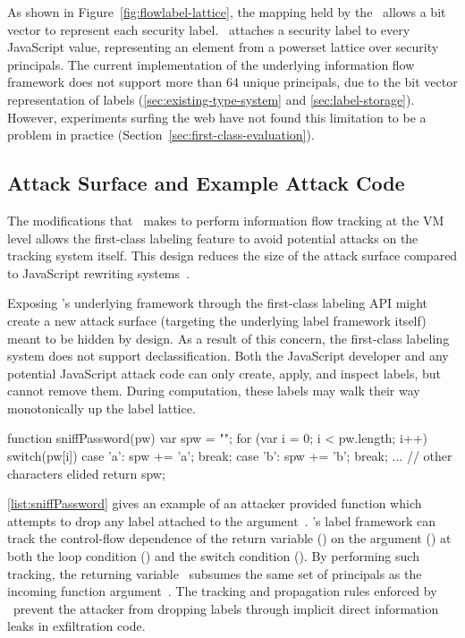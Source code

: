 As shown in Figure~\ref{fig:flowlabel-lattice}, the mapping held by the \FlowLabelRegistry\ allows a bit vector to represent each security label.
\FlowCore\ attaches a security label to every JavaScript value, representing an element from a powerset lattice over security principals.
The current implementation of the underlying information flow framework does not support more than 64 unique principals, due to the bit vector representation of labels (\autoref{sec:existing-type-system} and \autoref{sec:label-storage}).
However, experiments surfing the web have not found this limitation to be a problem in practice (Section~\ref{sec:first-class-evaluation}).

\subsection{Attack Surface and Example Attack Code}
\label{subsec:attack}

The modifications that \FlowCore\ makes to perform information flow tracking at the VM level allows the first-class labeling feature to avoid potential attacks on the tracking system itself.
This design reduces the size of the attack surface compared to JavaScript rewriting systems~\cite{chugh.etal+09, jang.etal+10}.

Exposing \FlowCore's underlying framework through the first-class labeling API might create a new attack surface (targeting the underlying label framework itself) meant to be hidden by design.
As a result of this concern, the first-class labeling system does not support declassification.
Both the JavaScript developer and any potential JavaScript attack code can only create, apply, and inspect labels, but cannot remove them.
During computation, these labels may walk their way monotonically up the label lattice.

\begin{jscode}
function sniffPassword(pw) {
  var spw = "";
  for (var i = 0; i < pw.length; i++) {
    switch(pw[i]) {
    case 'a': spw += 'a'; break;
    case 'b': spw += 'b'; break;
    ... // other characters elided
    }
  }
  return spw;
}
\end{jscode}

\autoref{list:sniffPassword} gives an example of an attacker provided function which attempts to drop any label attached to the argument~.
\FlowCore's label framework can track the control-flow dependence of the return variable () on the argument () at both the loop condition () and the switch condition ().
By performing such tracking, the returning variable~ subsumes the same set of principals as the incoming function argument~.
The tracking and propagation rules enforced by \FlowCore\ prevent the attacker from dropping labels through implicit direct information leaks in exfiltration code.

